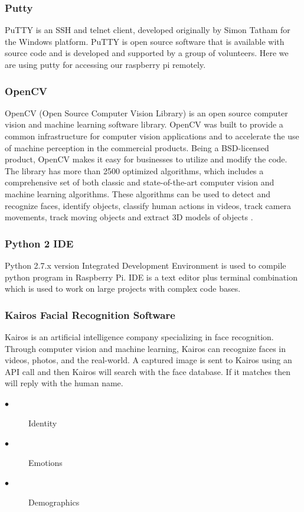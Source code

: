 \documentclass[sigconf]{acmart}
\begin{document}
\subsubsection{Putty}
PuTTY is an SSH and telnet client, developed originally by Simon Tatham for the Windows platform. PuTTY is open source software that is available with source code and is developed and supported by a group of volunteers. Here we are using putty for accessing our raspberry pi remotely.

\subsubsection{OpenCV}
OpenCV (Open Source Computer Vision Library) is an open source computer vision and machine learning software library. OpenCV was built to provide a common infrastructure for computer vision applications and to accelerate the use of machine perception in the commercial products. Being a BSD-licensed product, OpenCV makes it easy for businesses to utilize and modify the code. The library has more than 2500 optimized algorithms, which includes a comprehensive set of both classic and state-of-the-art computer vision and machine learning algorithms. These algorithms can be used to detect and recognize faces, identify objects, classify human actions in videos, track camera movements, track moving objects and extract 3D models of objects \cite{opencv}.

\subsubsection{Python 2 IDE}
Python 2.7.x version Integrated Development Environment is used to compile python program in Raspberry Pi. IDE is a text editor plus terminal combination which is used to work on large projects with complex code bases.

\subsubsection{Kairos Facial Recognition Software}
Kairos is an artificial intelligence company specializing in face recognition. Through computer vision and machine learning, Kairos can recognize faces in videos, photos, and the real-world. A captured image is sent to Kairos using an API call and then Kairos will search with the face database. If it matches then will reply with the human name.
\begin{description}
  \item[$\bullet$] Identity 
  \item[$\bullet$] Emotions 
  \item[$\bullet$] Demographics
\end{description}
\end{document}
